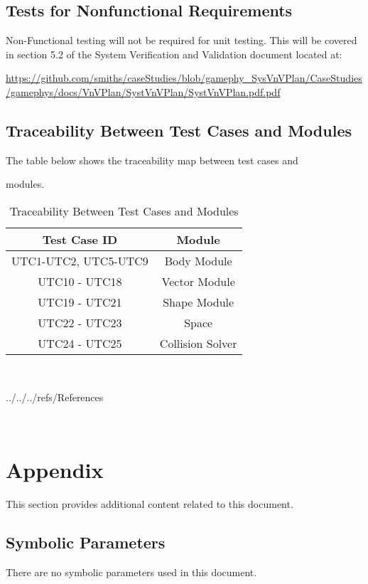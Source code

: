 \documentclass[12pt, titlepage]{article}
\begin{document}
\subsection{Tests for Nonfunctional Requirements}

Non-Functional testing will not be required for unit testing. This will be covered in section 5.2 of the System Verification and Validation document located at: 

\url{https://github.com/smiths/caseStudies/blob/gamephy_SysVnVPlan/CaseStudies/gamephys/docs/VnVPlan/SystVnVPlan/SystVnVPlan.pdf.pdf}

\subsection{Traceability Between Test Cases and Modules}

The table below shows the traceability map between test cases and 

modules.

\begin{table} [h!]
	
	\centering
	
	\begin{tabular}{|c|c|}
		
		\hline	
		
		\textbf{Test Case ID} & \textbf{Module}\\
		
		\hline 
		
	
		UTC1-UTC2, UTC5-UTC9& Body Module\\ \hline
		
		UTC10 - UTC18& Vector  Module\\ \hline
		
		UTC19 - UTC21&  Shape Module\\ \hline
		
		UTC22 - UTC23& Space\\ \hline
		
		UTC24 - UTC25 & Collision Solver\\ \hline
		
	\end{tabular}
	
	\caption{Traceability Between Test Cases and Modules}
	
	\label{Table:Traceability} 
	
\end{table}

~\newpage


 {../../../refs/References}

~\newpage



\section{Appendix}



This section provides additional content related to this document.



\subsection{Symbolic Parameters}



There are no symbolic parameters used in this document.
\end{document}
